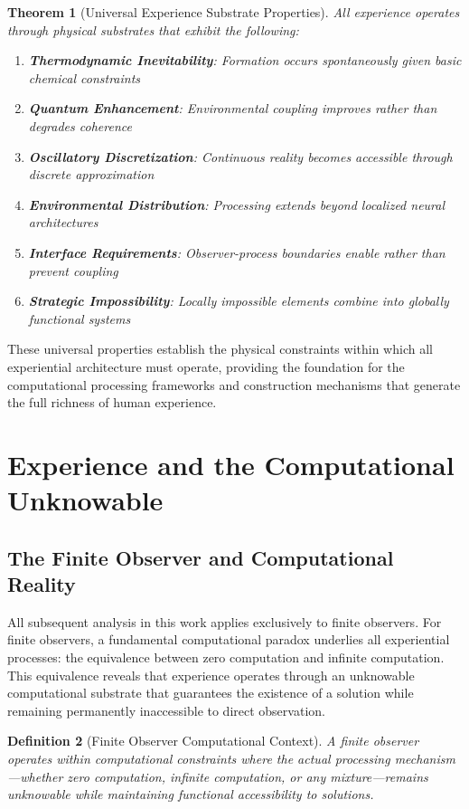\documentclass{article}
\newtheorem{theorem}{Theorem}[section]
\newtheorem{definition}[theorem]{Definition}
\begin{document}
\begin{theorem}[Universal Experience Substrate Properties]
All experience operates through physical substrates that exhibit the following:
\begin{enumerate}
\item \textbf{Thermodynamic Inevitability}: Formation occurs spontaneously given basic chemical constraints
\item \textbf{Quantum Enhancement}: Environmental coupling improves rather than degrades coherence
\item \textbf{Oscillatory Discretization}: Continuous reality becomes accessible through discrete approximation
\item \textbf{Environmental Distribution}: Processing extends beyond localized neural architectures
\item \textbf{Interface Requirements}: Observer-process boundaries enable rather than prevent coupling
\item \textbf{Strategic Impossibility}: Locally impossible elements combine into globally functional systems
\end{enumerate}
\end{theorem}

These universal properties establish the physical constraints within which all experiential architecture must operate, providing the foundation for the computational processing frameworks and construction mechanisms that generate the full richness of human experience.

\section{Experience and the Computational Unknowable}

\subsection{The Finite Observer and Computational Reality}

All subsequent analysis in this work applies exclusively to finite observers. For finite observers, a fundamental computational paradox underlies all experiential processes: the equivalence between zero computation and infinite computation. This equivalence reveals that experience operates through an unknowable computational substrate that guarantees the existence of a solution while remaining permanently inaccessible to direct observation.

\begin{definition}[Finite Observer Computational Context]
A finite observer operates within computational constraints where the actual processing mechanism—whether zero computation, infinite computation, or any mixture—remains unknowable while maintaining functional accessibility to solutions.
\end{definition}
\end{document}
